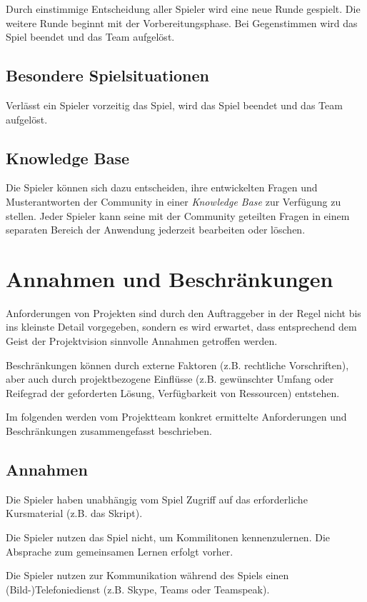 \documentclass[a4paper,11pt,listof=numbered,glossary=totoc,parskip=half,toc=bib]{scrreprt}
\begin{document}
{Durch einstimmige Entscheidung aller Spieler wird eine neue Runde gespielt. Die weitere Runde beginnt mit der Vorbereitungsphase. Bei Gegenstimmen wird das Spiel beendet und das Team aufgelöst.

\subsection{Besondere Spielsituationen}

Verlässt ein Spieler vorzeitig das Spiel, wird das Spiel beendet und das Team aufgelöst.

\subsection{Knowledge Base}

Die Spieler können sich dazu entscheiden, ihre entwickelten Fragen und Musterantworten der Community in einer \textit{Knowledge Base} zur Verfügung zu stellen.
Jeder Spieler kann seine mit der Community geteilten Fragen in einem separaten Bereich der Anwendung jederzeit bearbeiten oder löschen.
	\newpage
	\section{Annahmen und Beschränkungen}
	Anforderungen von Projekten sind durch den Auftraggeber in der Regel nicht bis ins kleinste Detail vorgegeben, sondern es wird erwartet, dass entsprechend dem Geist der Projektvision sinnvolle Annahmen getroffen werden. 
	
	Beschränkungen können durch externe Faktoren (z.B. rechtliche Vorschriften), aber auch durch projektbezogene Einflüsse (z.B. gewünschter Umfang oder Reifegrad der geforderten Lösung, Verfügbarkeit von Ressourcen) entstehen.	
	
	Im folgenden werden vom Projektteam konkret ermittelte Anforderungen und Beschränkungen zusammengefasst beschrieben.
	
	\subsection{Annahmen}
Die Spieler haben unabhängig vom Spiel Zugriff auf das erforderliche Kursmaterial (z.B. das Skript).

Die Spieler nutzen das Spiel nicht, um Kommilitonen kennenzulernen. Die Absprache zum gemeinsamen Lernen erfolgt vorher.

Die Spieler nutzen zur Kommunikation während des Spiels einen (Bild-)Telefoniedienst (z.B. Skype, Teams oder Teamspeak).

}
\end{document}
